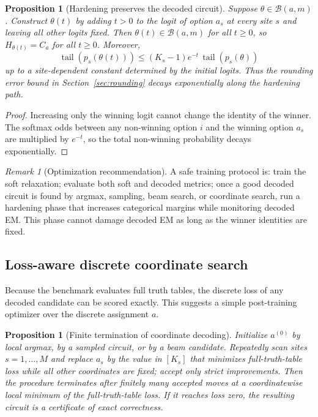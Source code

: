 \documentclass[11pt]{article}
\newtheorem{proposition}[theorem]{Proposition}
\theoremstyle{definition}
\theoremstyle{remark}
\newtheorem{remark}[theorem]{Remark}
\newcommand{\tail}{\operatorname{tail}}
\begin{document}
\begin{proposition}[Hardening preserves the decoded circuit]
\label{prop:hardening}
Suppose $\theta\in\mathcal B(a,m)$.  Construct $\theta(t)$ by adding $t>0$ to the logit of option $a_s$ at every site $s$ and leaving all other logits fixed.  Then $\theta(t)\in\mathcal B(a,m)$ for all $t\ge0$, so $H_{\theta(t)}=C_a$ for all $t\ge0$.  Moreover,
\[
    \tail(p_s(\theta(t)))\le (K_s-1)e^{-t}\,\tail(p_s(\theta))
\]
up to a site-dependent constant determined by the initial logits.  Thus the rounding error bound in Section~\ref{sec:rounding} decays exponentially along the hardening path.
\end{proposition}

\begin{proof}
Increasing only the winning logit cannot change the identity of the winner.  The softmax odds between any non-winning option $i$ and the winning option $a_s$ are multiplied by $e^{-t}$, so the total non-winning probability decays exponentially.
\end{proof}

\begin{remark}[Optimization recommendation]
A safe training protocol is: train the soft relaxation; evaluate both soft and decoded metrics; once a good decoded circuit is found by argmax, sampling, beam search, or coordinate search, run a hardening phase that increases categorical margins while monitoring decoded EM.  This phase cannot damage decoded EM as long as the winner identities are fixed.
\end{remark}

\subsection{Loss-aware discrete coordinate search}

Because the benchmark evaluates full truth tables, the discrete loss of any decoded candidate can be scored exactly.  This suggests a simple post-training optimizer over the discrete assignment $a$.

\begin{proposition}[Finite termination of coordinate decoding]
\label{prop:coordinate-decoding}
Initialize $a^{(0)}$ by local argmax, by a sampled circuit, or by a beam candidate.  Repeatedly scan sites $s=1,\ldots,M$ and replace $a_s$ by the value in $[K_s]$ that minimizes full-truth-table loss while all other coordinates are fixed; accept only strict improvements.  Then the procedure terminates after finitely many accepted moves at a coordinatewise local minimum of the full-truth-table loss.  If it reaches loss zero, the resulting circuit is a certificate of exact correctness.
\end{proposition}
\end{document}
